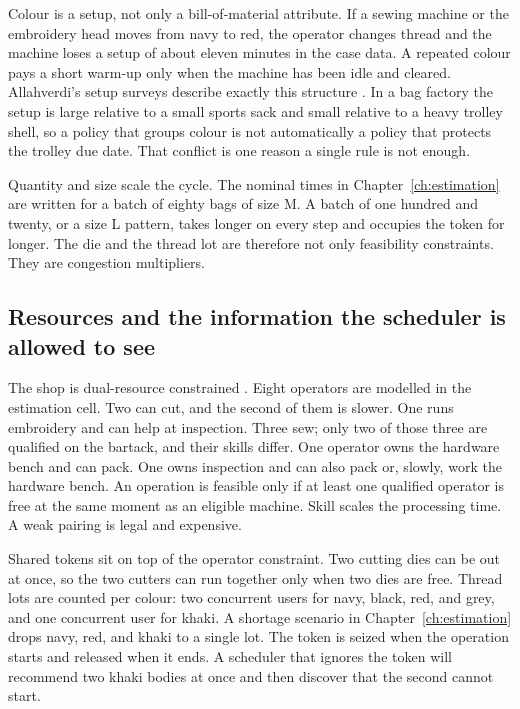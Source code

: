 Colour is a setup, not only a bill-of-material attribute. If a sewing machine or the embroidery head moves from navy to red, the operator changes thread and the machine loses a setup of about eleven minutes in the case data. A repeated colour pays a short warm-up only when the machine has been idle and cleared. Allahverdi's setup surveys describe exactly this structure \cite{allahverdi2015}. In a bag factory the setup is large relative to a small sports sack and small relative to a heavy trolley shell, so a policy that groups colour is not automatically a policy that protects the trolley due date. That conflict is one reason a single rule is not enough.

Quantity and size scale the cycle. The nominal times in Chapter~\ref{ch:estimation} are written for a batch of eighty bags of size M. A batch of one hundred and twenty, or a size L pattern, takes longer on every step and occupies the token for longer. The die and the thread lot are therefore not only feasibility constraints. They are congestion multipliers.

\subsection{Resources and the information the scheduler is allowed to see}

The shop is dual-resource constrained \cite{xu2011}. Eight operators are modelled in the estimation cell. Two can cut, and the second of them is slower. One runs embroidery and can help at inspection. Three sew; only two of those three are qualified on the bartack, and their skills differ. One operator owns the hardware bench and can pack. One owns inspection and can also pack or, slowly, work the hardware bench. An operation is feasible only if at least one qualified operator is free at the same moment as an eligible machine. Skill scales the processing time. A weak pairing is legal and expensive.

Shared tokens sit on top of the operator constraint. Two cutting dies can be out at once, so the two cutters can run together only when two dies are free. Thread lots are counted per colour: two concurrent users for navy, black, red, and grey, and one concurrent user for khaki. A shortage scenario in Chapter~\ref{ch:estimation} drops navy, red, and khaki to a single lot. The token is seized when the operation starts and released when it ends. A scheduler that ignores the token will recommend two khaki bodies at once and then discover that the second cannot start.

